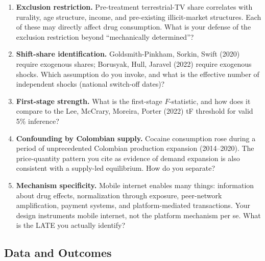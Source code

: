\documentclass[11pt,a4paper]{article}
\begin{document}
\begin{enumerate}
\item \textbf{Exclusion restriction.} Pre-treatment terrestrial-TV share correlates with rurality, age structure, income, and pre-existing illicit-market structures. Each of these may directly affect drug consumption. What is your defense of the exclusion restriction beyond ``mechanically determined''?

\item \textbf{Shift-share identification.} Goldsmith-Pinkham, Sorkin, Swift (2020) require exogenous shares; Borusyak, Hull, Jaravel (2022) require exogenous shocks. Which assumption do you invoke, and what is the effective number of independent shocks (national switch-off dates)?

\item \textbf{First-stage strength.} What is the first-stage $F$-statistic, and how does it compare to the Lee, McCrary, Moreira, Porter (2022) tF threshold for valid 5\% inference?

\item \textbf{Confounding by Colombian supply.} Cocaine consumption rose during a period of unprecedented Colombian production expansion (2014--2020). The price-quantity pattern you cite as evidence of demand expansion is also consistent with a supply-led equilibrium. How do you separate?

\item \textbf{Mechanism specificity.} Mobile internet enables many things: information about drug effects, normalization through exposure, peer-network amplification, payment systems, and platform-mediated transactions. Your design instruments mobile internet, not the platform mechanism per se. What is the LATE you actually identify?
\end{enumerate}

\subsection{Data and Outcomes}
\end{document}
